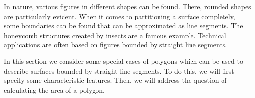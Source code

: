 


\begin{MIntro}

In nature, various figures in different shapes can be found. There, 
rounded shapes are particularly evident. When it comes to partitioning a surface 
completely, some boundaries can be found that can be approximated as line 
segments. The honeycomb structures created by 
insects are a famous example. Technical applications are often based on figures bounded by straight 
line segments.
 

In this section we consider some special cases of polygons which can be 
used to describe surfaces bounded by straight line segments. To do this, we
will first specify some characteristic features. Then, we will address the 
question of calculating the area of a polygon.
\end{MIntro}


